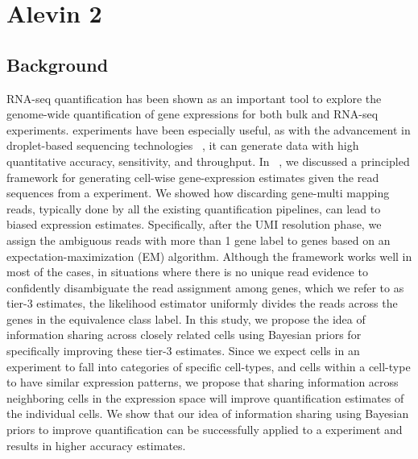
\chapter{Alevin 2} %

\label{alevin2} %


\section{Background}

RNA-seq quantification has been shown as an important tool to explore the genome-wide
quantification of gene expressions for both bulk and \singlecell RNA-seq experiments.
\dscrnaseq experiments have been especially useful, as with the advancement in droplet-based 
sequencing technologies ~\citep{dropseq, indrop, tenx}, it can generate data with high 
quantitative accuracy, sensitivity, and throughput. In ~, we discussed a 
principled framework for generating cell-wise gene-expression estimates given the read sequences
from a \dscrnaseq experiment. We showed how discarding gene-multi mapping reads, typically done 
by all the existing \dscrnaseq quantification pipelines, can lead to biased expression estimates. 
Specifically, after the UMI resolution phase, we assign the ambiguous reads with more than 1 gene label to
genes based on an expectation-maximization (EM) algorithm. Although the framework works well in most of the cases, 
in situations where there is no unique read evidence to confidently disambiguate the read assignment
among genes, which we refer to as tier-3 estimates, the likelihood estimator uniformly divides the reads 
across the genes in the equivalence class label. In this study, we propose the idea of information sharing across closely 
related cells using Bayesian priors for specifically improving these tier-3 estimates. Since we expect cells in an experiment
to fall into categories of specific cell-types, and cells within a cell-type to have similar expression patterns, we propose that
sharing information across neighboring cells in the expression space will improve quantification 
estimates of the individual cells. We show that our idea of information sharing using Bayesian 
priors to improve quantification can be successfully applied to a \dscrnaseq experiment and results in higher accuracy estimates.

